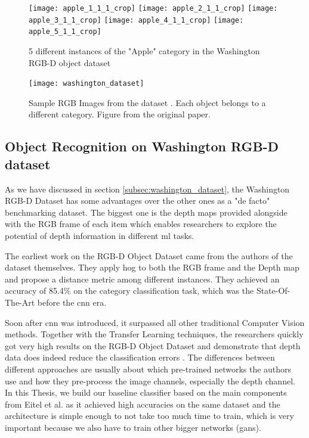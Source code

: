 \begin{figure}[h]
	\centering
	\texttt{[image: apple\_1\_1\_1\_crop]}
	\texttt{[image: apple\_2\_1\_1\_crop]}
	\texttt{[image: apple\_3\_1\_1\_crop]}
	\texttt{[image: apple\_4\_1\_1\_crop]}
	\texttt{[image: apple\_5\_1\_1\_crop]}
	\caption{5 different instances of the "Apple" category in the Washington RGB-D object dataset}
	\label{fig:apple_washington}
\end{figure}

\begin{figure}[h]
	\centering
	\texttt{[image: washington\_dataset]}
	\caption{Sample RGB Images from the dataset \cite{washington_rgbd}. Each object belongs to a different
		category. Figure from the original paper. }
	\label{fig:washington_dataset}
\end{figure}

\subsection{Object Recognition on Washington RGB-D dataset \cite{eitel}}

As we have discussed in section \ref{subsec:washington_dataset}, the Washington RGB-D
Dataset has some advantages over the other ones as a "de facto" benchmarking dataset. The
biggest one is the depth maps provided alongside with the RGB frame of each item which
enables researchers to explore the potential of depth information in different
\acrshort{ml} tasks. 

The earliest work on the RGB-D Object Dataset came from the authors of the dataset
themselves. They apply \acrfull{hog} to both the RGB frame and the Depth map and propose a
distance metric among different instances. They achieved an accuracy of 85.4\% on the
category classification task, which was the State-Of-The-Art before the \acrshort{cnn}
era.

Soon after \acrshort{cnn} was introduced, it surpassed all other traditional Computer
Vision methods. Together with the Transfer Learning techniques, the researchers quickly
got very high results on the RGB-D Object Dataset and demonstrate that depth data does
indeed reduce the classification errors \cite{eitel, alexandre}. The differences between
different approaches are usually about which pre-trained networks the authors use and how
they pre-process the image channels, especially the depth channel. In this Thesis, we
build our baseline classifier based on the main components from Eitel et al.  \cite{eitel}
as it achieved high accuracies on the same dataset and the architecture is simple enough
to not take too much time to train, which is very important because we also have to train
other bigger networks (\acrshort{gan}s).

